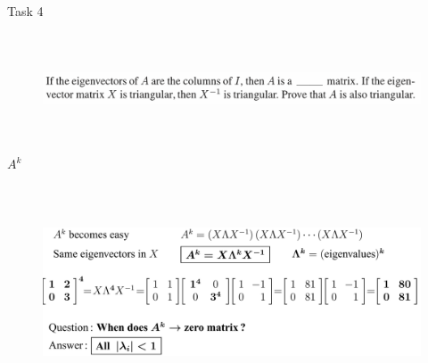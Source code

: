 \documentclass[aspectratio=169]{beamer}
\begin{document}
\begin{frame}[t]{Task 4}
    \framesubtitle{}
    \vspace{-0.5cm}
    \begin{figure}[H]
        \centering\includegraphics[height=3cm,width=1\textwidth,keepaspectratio]{4.png}
        \label{fig:4.png}
    \end{figure}
\end{frame}

\begin{frame}[t]{$A^k$}
\framesubtitle{}
    \begin{figure}[H]
        \centering\includegraphics[height=6cm,width=1\textwidth,keepaspectratio]{Power.png}
        \label{fig:Power.png}
    \end{figure}
\end{frame}
\end{document}

